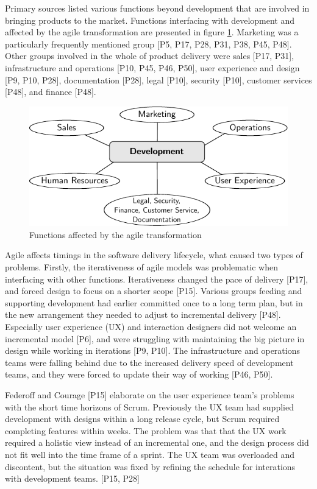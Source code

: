 \documentclass[preprint,authoryear,12pt]{elsarticle}
\begin{document}
Primary sources listed various functions beyond development that are involved in
bringing products to the market. Functions interfacing with development and
affected by the agile transformation are presented in figure
\ref{fig:challenges_other_functions}.
Marketing was a particularly frequently mentioned group [P5, P17, P28, P31, P38,
P45, P48]. Other groups involved in the whole of product delivery were sales
[P17, P31], infrastructure and operations [P10, P45, P46, P50], user experience
and design [P9, P10, P28], documentation [P28], legal [P10], security [P10],
customer services [P48], and finance [P48].

\begin{figure}
  \begin{center}
    \includegraphics{graphics/challenges_other_functions.pdf}
    \caption{Functions affected by the agile transformation}
    \label{fig:challenges_other_functions}
  \end{center}
\end{figure}

Agile affects timings in the software delivery lifecycle, what caused two types
of problems. Firstly, the iterativeness of agile models was problematic when
interfacing with other functions. Iterativeness changed the pace of delivery
[P17], and forced design to focus on a shorter scope [P15]. Various groups
feeding and supporting development had earlier committed once to a long term
plan, but in the new arrangement they needed to adjust to incremental delivery
[P48].
Especially user experience (UX) and interaction designers did not welcome an
incremental model [P6], and were struggling with maintaining the big picture in
design while working in iterations [P9, P10].
The infrastructure and operations teams were falling behind due to the increased
delivery speed of development teams, and they were forced to update their way of
working [P46, P50].

Federoff and Courage [P15] elaborate on the user experience team's problems
with the short time horizons of Scrum. Previously the UX team had supplied
development with designs within a long release cycle, but Scrum required
completing features within weeks. The problem was that that the UX work required
a holistic view instead of an incremental one, and the design process did not
fit well into the time frame of a sprint. The UX team was overloaded and
discontent, but the situation was fixed by refining the schedule for interations
with development teams. [P15, P28]
\end{document}
